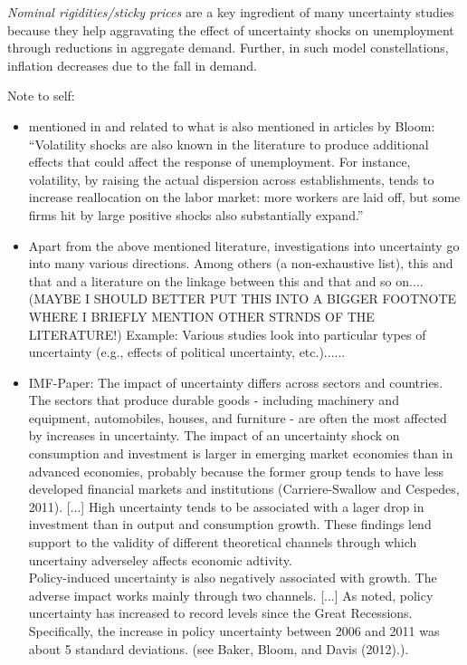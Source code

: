 \documentclass[a4paper,11pt,listof=nochaptergap,oneside,pointednumbers,bibtotoc,bigheadings,liststotoc]{scrbook}
\theoremstyle{mysatz}
\theoremstyle{mydefinition}
\theoremstyle{mybemerkung}
\begin{document}
\textit{Nominal rigidities/sticky prices} are a key ingredient of many uncertainty studies because they help aggravating the effect of uncertainty shocks on unemployment through reductions in aggregate demand. Further, in such model constellations, inflation decreases due to the fall in demand.

\begingroup
    \fontsize{8pt}{12pt}\selectfont
    Note to self:
\begin{itemize}
	\item mentioned in \citet{schaal:17} and related to what is also mentioned in articles by Bloom: ``Volatility shocks are also known in the literature to produce additional effects that could affect the response of unemployment. For instance, volatility, by raising the actual dispersion across establishments, tends to increase reallocation on the labor market: more workers are laid off, but some firms hit by large positive shocks also substantially expand.''
	\item Apart from the above mentioned literature, investigations into uncertainty go into many various directions. Among others (a non-exhaustive list), this and that and a literature on the linkage between this and that and so on....(MAYBE I SHOULD BETTER PUT THIS INTO A BIGGER FOOTNOTE WHERE I BRIEFLY MENTION OTHER STRNDS OF THE LITERATURE!) Example: Various studies look into particular types of uncertainty (e.g., effects of political uncertainty, etc.)......
	\item
	IMF-Paper:	
	The impact of uncertainty differs across sectors and countries. The sectors that produce durable goods - including machinery and equipment, automobiles, houses, and furniture - are often the most affected by increases in uncertainty. The impact of an uncertainty shock on consumption and investment is larger in emerging market economies than in advanced economies, probably because the former group tends to have less developed financial markets and institutions (Carriere-Swallow and Cespedes, 2011). [...] High uncertainty tends to be associated with a lager drop in investment than in output and consumption growth. These findings lend support to the validity of different theoretical channels through which uncertainy adverseley affects economic adtivity. \\
	Policy-induced uncertainty is also negatively associated with growth. The adverse impact works mainly through two channels. [...] As noted, policy uncertainty has increased to record levels since the Great Recessions. Specifically, the increase in policy uncertainty between 2006 and 2011 was about 5 standard deviations. (see Baker, Bloom, and Davis (2012).).

\end{itemize}
\end{document}
